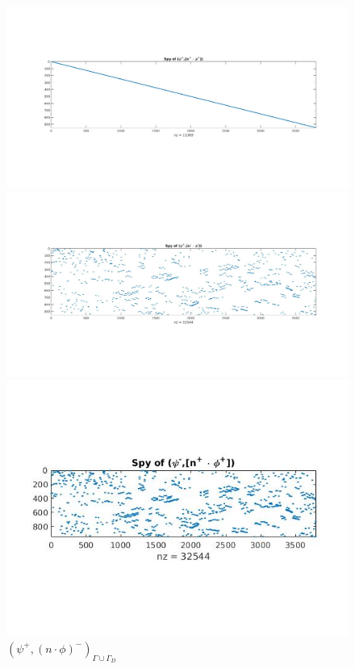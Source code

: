 \documentclass[a4paper]{book}
\begin{document}
\begin{figure}[H]
  \begin{minipage}[c]{0.5\textwidth}
    \includegraphics[width=\textwidth]{figure41.jpg}
  \caption{$( \psi^+ ,(n \cdot \phi)^+)_{\Gamma \cup \Gamma_D}$}
  \label{fig:figure41}
  \end{minipage}\hfill
  \begin{minipage}[c]{0.5\textwidth}
    \includegraphics[width=\textwidth]{figure42.jpg}
  \caption{$( \psi^+ ,(n \cdot \phi)^-)_{\Gamma \cup \Gamma_D}$}
  \label{fig:figure42}
  \end{minipage}\hfill
    \begin{minipage}[c]{0.5\textwidth}
    \includegraphics[width=\textwidth]{figure43.jpg}

\end{minipage}
\end{figure}
\end{document}
